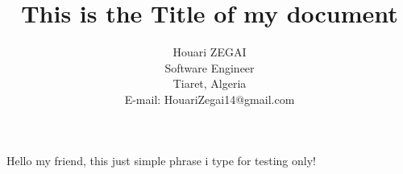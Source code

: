 \documentclass{article}
\title{This is the Title of my document}
\author{Houari ZEGAI\\ %
	Software Engineer\\
	Tiaret, Algeria\\
	E-mail: HouariZegai14@gmail.com}
\date{} %
\begin{document}
	\maketitle
	Hello my friend, this just simple phrase i type for testing only!
\end{document}
